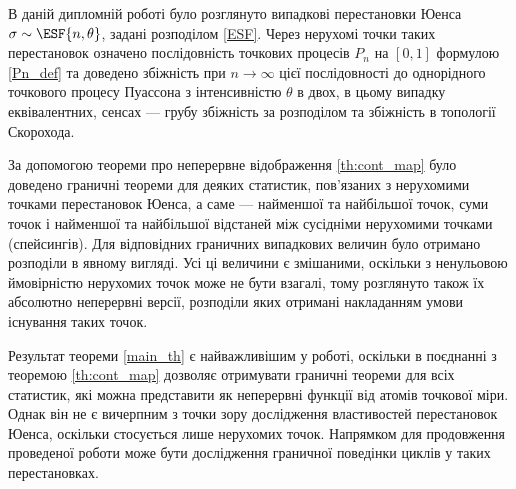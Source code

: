 \hspace{\parindent}
В даній дипломній роботі було розглянуто випадкові перестановки Юенса
$\sigma \sim \ESF{n, \theta}$, задані розподілом \eqref{ESF}. 
Через нерухомі точки таких перестановок означено послідовність 
точкових процесів $P_n$ на $[0, 1]$ формулою
\eqref{Pn_def} та доведено збіжність при $n \to \infty$ цієї
послідовності до однорідного точкового процесу
Пуассона з інтенсивністю $\theta$ в двох,
в цьому випадку еквівалентних, сенсах --- грубу
збіжність за розподілом та збіжність в топології Скорохода.

За допомогою теореми про неперервне відображення
\ref{th:cont_map} було доведено граничні теореми для
деяких статистик, пов'язаних з нерухомими точками
перестановок Юенса, а саме --- найменшої та найбільшої точок, 
суми точок і найменшої та найбільшої
відстаней між сусідніми нерухомими точками (спейсингів).
Для відповідних граничних випадкових величин було отримано
розподіли в явному вигляді. Усі ці величини є змішаними, 
оскільки з ненульовою ймовірністю
нерухомих точок може не бути взагалі, тому розглянуто
також їх абсолютно неперервні версії, розподіли яких отримані 
накладанням умови існування таких точок.

Результат теореми \ref{main_th} є найважливішим у роботі,
оскільки в поєднанні з теоремою \ref{th:cont_map} дозволяє 
отримувати граничні теореми для всіх статистик, які можна представити
як неперервні функції від атомів точкової міри. Однак він не є вичерпним
з точки зору дослідження властивостей перестановок Юенса,
оскільки стосується лише нерухомих точок. Напрямком для продовження проведеної
роботи може бути дослідження граничної поведінки циклів у таких перестановках.